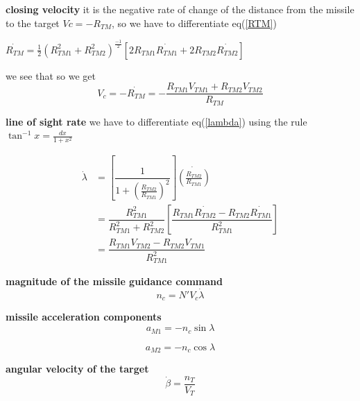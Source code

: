 \textbf{closing velocity} it is the negative rate of change of the distance
from the missile to the target $Vc= -R_{TM} $, so we have to differentiate eq(\ref{RTM})

\begin{center}
	$\dot{R_{TM}}= \frac{1}{2} (R_{TM1}^2 + R_{TM2}^2)^{\frac{-1}{2}} [2 R_{TM1} \dot{R_{TM1}} + 2 R_{TM2} \dot{R_{TM2}}]$
\end{center}

we see that
so we get 
\begin{equation}
V_c = - \dot{R_{TM}} = - \dfrac{R_{TM1} V_{TM1}+R_{TM2} V_{TM2}}{R_{TM}}
\end{equation}

\textbf{line of sight rate} we have to differentiate eq(\ref{lambda}) using the rule $\tan^{-1}x = \frac{dx}{1+x^2}$ 

\begin{equation}
\begin{split}
\dot{\lambda} &= [\dfrac{1}{1+(\frac{R_{TM2}}{R_{TM1}})^2}] \dot{(\frac{R_{TM2}}{R_{TM1}})}\\
&= \dfrac{R_{TM1}^2}{R_{TM1}^2 + R_{TM2}^2}[\dfrac{R_{TM1}\dot{R_{TM2}}- R_{TM2} \dot{R_{TM1}}}{R_{TM1}^2}]\\
&=\dfrac{R_{TM1} V_{TM2} - R_{TM2} V_{TM1}}{R_{TM1}^2}
\end{split}
\end{equation}

\textbf{magnitude of the missile guidance command}
\begin{equation}
n_c= N' V_c \dot{\lambda}
\end{equation}

\textbf{missile acceleration components}
\begin{equation}
a_{M1} = - n_c \sin \lambda
\end{equation}

\begin{equation}
a_{M2} = - n_c \cos \lambda
\end{equation}

\textbf{angular velocity of the target}
\begin{equation}
\dot{\beta} = \dfrac{n_T}{V_T}
\end{equation}

